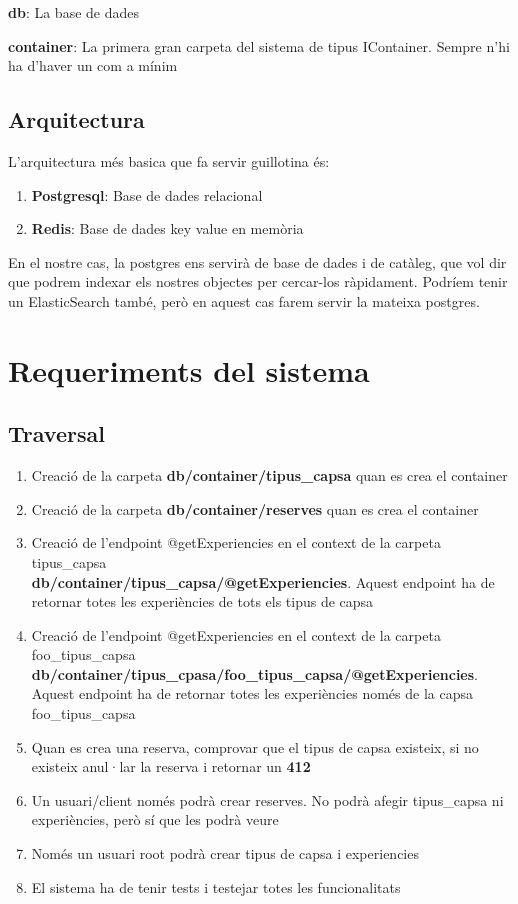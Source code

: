 \documentclass[a4paper, 11pt]{article}
\begin{document}
\textbf{db}: La base de dades

\textbf{container}: La primera gran carpeta del sistema de tipus
IContainer. Sempre n'hi ha d'haver un com a mínim
\subsection{Arquitectura}
L'arquitectura més basica que fa servir guillotina és:
\begin{enumerate}
\item \textbf{Postgresql}: Base de dades relacional
\item \textbf{Redis}: Base de dades key value en memòria
\end{enumerate}
En el nostre cas, la postgres ens servirà de base de dades i de
catàleg, que vol dir que podrem indexar els nostres objectes per
cercar-los ràpidament. Podríem tenir un ElasticSearch també, però en
aquest cas farem servir la mateixa postgres.


\section{Requeriments del sistema}
\subsection{Traversal}
\begin{enumerate}
\item Creació de la carpeta \textbf{db/container/tipus\_capsa} quan es crea el container
\item Creació de la carpeta \textbf{db/container/reserves} quan es crea el container
\item Creació de l'endpoint {@}getExperiencies en el context de la
  carpeta tipus\_capsa \\ \textbf{db/container/tipus\_capsa/{@}getExperiencies}. Aquest
  endpoint ha de retornar totes les experiències de tots els tipus
  de capsa
\item Creació de l'endpoint {@}getExperiencies en el context de la
  carpeta foo\_tipus\_capsa \\
  \textbf{db/container/tipus\_cpasa/foo\_tipus\_capsa/{@}getExperiencies}. Aquest
  endpoint ha de retornar totes les experiències només de la capsa
  foo\_tipus\_capsa
\item Quan es crea una reserva, comprovar que el tipus de capsa
  existeix, si no existeix anul·lar la reserva i retornar un \textbf{412}
\item Un usuari/client només podrà crear reserves. No podrà afegir
  tipus\_capsa ni experiències, però sí que les podrà veure
\item Només un usuari root podrà crear tipus de capsa i experiencies
\item El sistema ha de tenir tests i testejar totes les funcionalitats
\end{enumerate}
\end{document}
